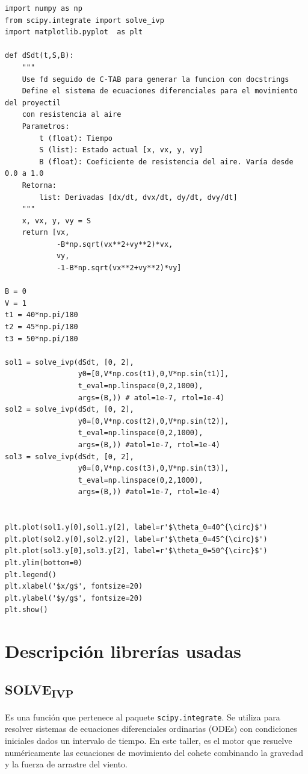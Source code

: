 \documentclass{article}
\begin{document}
\begin{verbatim}
import numpy as np
from scipy.integrate import solve_ivp
import matplotlib.pyplot  as plt

def dSdt(t,S,B):
    """
    Use fd seguido de C-TAB para generar la funcion con docstrings
    Define el sistema de ecuaciones diferenciales para el movimiento del proyectil
    con resistencia al aire
    Parametros:
        t (float): Tiempo
        S (list): Estado actual [x, vx, y, vy]
        B (float): Coeficiente de resistencia del aire. Varía desde 0.0 a 1.0
    Retorna:
        list: Derivadas [dx/dt, dvx/dt, dy/dt, dvy/dt]
    """
    x, vx, y, vy = S
    return [vx,
            -B*np.sqrt(vx**2+vy**2)*vx,
            vy,
            -1-B*np.sqrt(vx**2+vy**2)*vy]

B = 0
V = 1
t1 = 40*np.pi/180
t2 = 45*np.pi/180
t3 = 50*np.pi/180

sol1 = solve_ivp(dSdt, [0, 2],
                 y0=[0,V*np.cos(t1),0,V*np.sin(t1)],
                 t_eval=np.linspace(0,2,1000),
                 args=(B,)) # atol=1e-7, rtol=1e-4)
sol2 = solve_ivp(dSdt, [0, 2],
                 y0=[0,V*np.cos(t2),0,V*np.sin(t2)],
                 t_eval=np.linspace(0,2,1000),
                 args=(B,)) #atol=1e-7, rtol=1e-4)
sol3 = solve_ivp(dSdt, [0, 2],
                 y0=[0,V*np.cos(t3),0,V*np.sin(t3)],
                 t_eval=np.linspace(0,2,1000),
                 args=(B,)) #atol=1e-7, rtol=1e-4)


plt.plot(sol1.y[0],sol1.y[2], label=r'$\theta_0=40^{\circ}$')
plt.plot(sol2.y[0],sol2.y[2], label=r'$\theta_0=45^{\circ}$')
plt.plot(sol3.y[0],sol3.y[2], label=r'$\theta_0=50^{\circ}$')
plt.ylim(bottom=0)
plt.legend()
plt.xlabel('$x/g$', fontsize=20)
plt.ylabel('$y/g$', fontsize=20)
plt.show()

\end{verbatim}


\section{Descripción librerías usadas}
\label{sec:org17c8fe7}
\subsection{SOLVE\textsubscript{IVP}}
\label{sec:org2e2c5b6}
Es una función que pertenece al paquete \texttt{scipy.integrate}. Se utiliza
para resolver sistemas de ecuaciones diferenciales ordinarias (ODEs)
con condiciones iniciales dados un intervalo de tiempo. En este
taller, es el motor que resuelve numéricamente las ecuaciones de
movimiento del cohete combinando la gravedad y la fuerza de arrastre
del viento.
\end{document}
